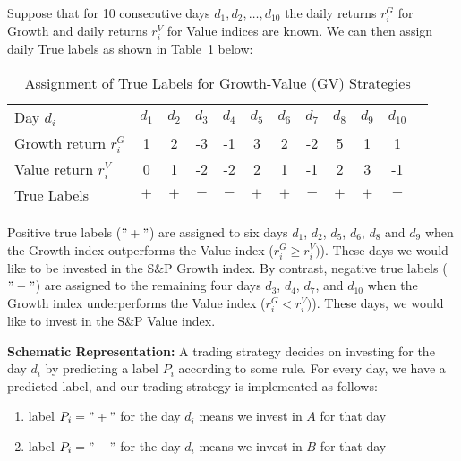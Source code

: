 \documentclass{article}
\begin{document}
Suppose that for 10 consecutive days 
$d_{1}, d_{2},\ldots, d_{10}$ the daily returns $r_{i}^{G}$ for Growth and daily returns $r_{i}^{V}$ for Value 
indices are known. We can then assign daily True labels as shown in Table~\ref{tab_true_label_assignment_growth_value} below:
\begin{table}[!ht]
    \centering
    \caption{Assignment of True Labels for Growth-Value (GV) Strategies}
    \vspace{0.1in}
    \begin{tabular}{l c c c c c c  c c c c c}
    \hline
        Day $d_{i}$ &   $d_{1}$ & $d_{2}$ & $d_{3}$ & $d_{4}$ & $d_{5}$ & $d_{6}$ & $d_{7}$ & $d_{8}$ & $d_{9}$ & $d_{10}$ \\
       Growth return $r_{i}^{G}$  & 1 & 2 & -3 & -1  & 3 & 2 & -2 & 5 & 1 & 1\\
       Value  return $r_{i}^{V}$  & 0 & 1 & -2  & -2  & 2 & 1 & -1 & 2 & 3 & -1\\
       True Labels  &  $+$ & $+$ & $-$ & $-$ & $+$ & $+$ & $-$ & $+$ & $+$ & $-$\\
        \hline
\end{tabular}
\label{tab_true_label_assignment_growth_value}
\end{table}

Positive true labels  ($"+"$) are assigned to six days $d_{1}$, $d_{2}$, $d_{5}$, $d_{6}$, $d_{8}$ and $d_{9}$ when the Growth index outperforms the Value index
($r_{i}^{G}\geq r_{i}^{V})$).  These days we would like to be invested in the S{\&}P Growth index.
By contrast, negative true labels ($"-"$) are assigned to the remaining four days $d_{3}$, $d_{4}$, $d_{7}$, and $d_{10}$ when the Growth index underperforms the Value index
($r_{i}^{G}< r_{i}^{V})$).  These days, we would like to invest in the S{\&}P Value index.

\medskip
\noindent
{\bf Schematic Representation: } A trading strategy decides on investing for the day $d_{i}$ by predicting a label $P_{i}$ according to some rule. For every day, we have a predicted label, and our trading strategy is implemented as follows:
\medskip
\begin{enumerate}[nosep]
\item label $P_{i}="+"$ for the day $d_{i}$ means we invest in $A$ for that day
\item label $P_{i}="-"$ for the day $d_{i}$ means we invest in $B$ for that day
\end{enumerate}
\end{document}
